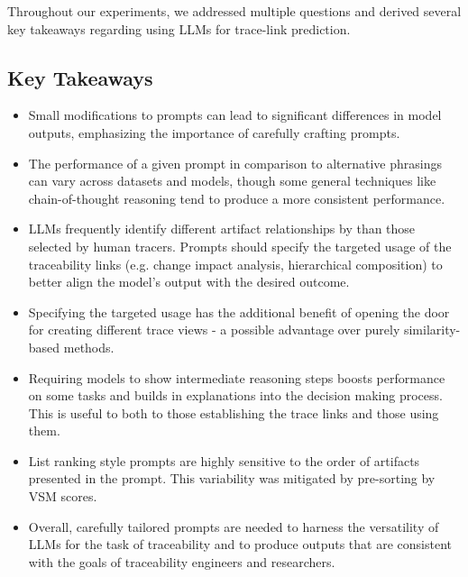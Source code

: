 

Throughout our experiments, we addressed multiple questions and derived several key takeaways regarding using LLMs for trace-link prediction.

\subsection{Key Takeaways}

\begin{itemize}
\item Small modifications to prompts can lead to significant differences in model outputs, emphasizing the importance of carefully crafting prompts.

\item The performance of a given prompt in comparison to alternative phrasings can vary across datasets and models, though some general techniques like chain-of-thought reasoning tend to produce a more consistent performance.

\item LLMs frequently identify different artifact relationships by than those selected by human tracers. Prompts should specify the targeted usage of the traceability links (e.g. change impact analysis, hierarchical composition) to better align the model's output with the desired outcome.

\item Specifying the targeted usage has the additional benefit of opening the door for creating different trace views - a possible advantage over purely similarity-based methods.


\item Requiring models to show intermediate reasoning steps boosts performance on some tasks and builds in explanations into the decision making process. This is useful to both to those establishing the trace links and those using them. 

\item List ranking style prompts are highly sensitive to the order of artifacts presented in the prompt. This variability was mitigated by pre-sorting by VSM scores.

\item Overall, carefully tailored prompts are needed to harness the versatility of LLMs for the task of traceability and to produce outputs that are consistent with the goals of traceability engineers and researchers.

\end{itemize}


